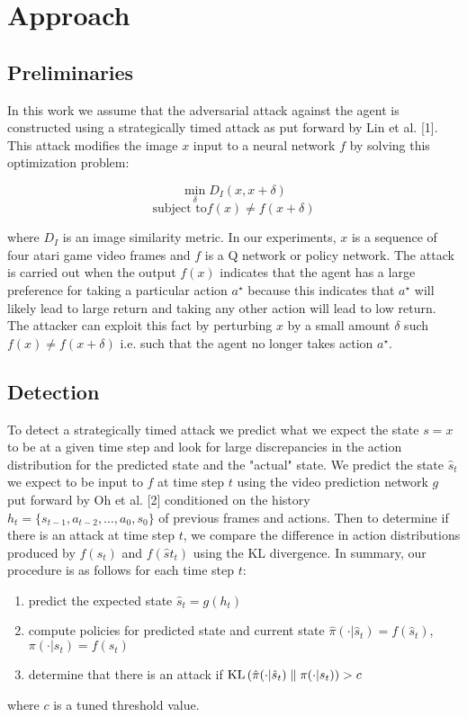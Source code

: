 \section{Approach}

\subsection{Preliminaries}
In this work we assume that the adversarial attack against the agent
is constructed using a strategically timed attack as put forward by
Lin et al. [1]. This attack modifies the image $x$ input to a neural network
$f$ by solving this optimization problem:

$$\min_{\delta}{D_I(x, x + \delta)}$$
$$\mbox{subject to} f(x) \neq f(x + \delta)$$

where $D_I$ is an image similarity metric.
In our experiments, $x$ is a sequence of four atari game video frames
and $f$ is a Q network or policy network. The attack is carried out when
the output $f(x)$ indicates that the agent has a large preference for
taking a particular action $a^\star$ because this indicates that $a^\star$
will likely lead to large return and taking any other action will lead to
low return. The attacker can exploit this fact by perturbing $x$ by a small
amount $\delta$ such $f(x) \neq f(x + \delta)$ i.e. such that the agent no longer
takes action $a^\star$.

\subsection{Detection}
To detect a strategically timed attack we predict what we expect the state $s = x$
to be at a given time step and look for large discrepancies in the
action distribution for the predicted state and the "actual" state.
We predict the state $\hat s_t$ we expect to be input to $f$ at time step $t$
using the video prediction network $g$ put forward by Oh et al. [2]
conditioned on the history $h_t = \{s_{t-1}, a_{t-2}, \dots, a_0, s_0\}$ of
previous frames and actions. Then to determine if there is an attack
at time step $t$, we compare the difference in action distributions
produced by $f(s_t)$ and $f(\hat st_t)$ using the \textrm{KL} divergence.
In summary, our procedure is as follows for each time step $t$:
\begin{enumerate}
    \item predict the expected state $\hat s_t = g(h_t)$
    \item compute policies for predicted state and current state $\hat \pi( \cdot \vert \hat s_t) = f(\hat s_t)$, $\pi( \cdot \vert s_t) = f(s_t)$
    \item determine that there is an attack if $\textrm{KL}\left(\hat \pi( \cdot \vert \hat s_t)\;\|\;\pi( \cdot \vert s_t)\right) > c$
\end{enumerate}
where $c$ is a tuned threshold value.

